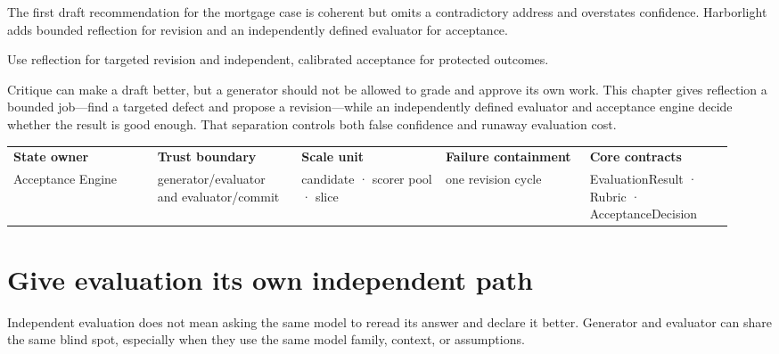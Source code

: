 
\begin{bookcallout}
The first draft recommendation for the mortgage case is coherent but omits a contradictory address and overstates confidence. Harborlight adds bounded reflection for revision and an independently defined evaluator for acceptance.
\end{bookcallout}

\begin{bookcallout}
Use reflection for targeted revision and independent, calibrated acceptance for protected outcomes.
\end{bookcallout}

Critique can make a draft better, but a generator should not be allowed to grade and approve its own work. This chapter gives reflection a bounded job—find a targeted defect and propose a revision—while an independently defined evaluator and acceptance engine decide whether the result is good enough. That separation controls both false confidence and runaway evaluation cost.\par

\BookTableStart
\fontsize{7.2}{9}\selectfont
\begin{tabular}{@{}Y{0.1880\linewidth}Y{0.1880\linewidth}Y{0.1880\linewidth}Y{0.1880\linewidth}Y{0.1880\linewidth}@{}}
\color{white}\bfseries \textbf{State owner} & \color{white}\bfseries \textbf{Trust boundary} & \color{white}\bfseries \textbf{Scale unit} & \color{white}\bfseries \textbf{Failure containment} & \color{white}\bfseries \textbf{Core contracts} \\
Acceptance Engine & generator/evaluator and evaluator/commit & candidate · scorer pool · slice & one revision cycle & EvaluationResult · Rubric · AcceptanceDecision \\
\end{tabular}
\BookTableEnd

\section{Give evaluation its own independent path}

Independent evaluation does not mean asking the same model to reread its answer and declare it better. Generator and evaluator can share the same blind spot, especially when they use the same model family, context, or assumptions.\par

